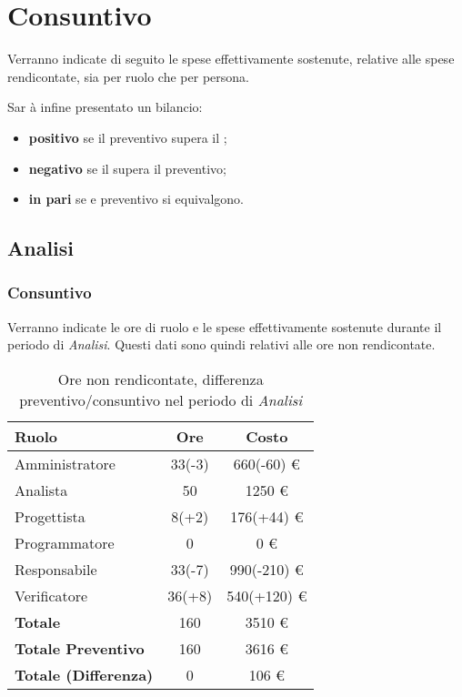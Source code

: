 \section{Consuntivo}
Verranno indicate di seguito le spese effettivamente sostenute, relative alle spese rendicontate, sia per ruolo che per persona.

Sar \`a infine presentato un bilancio:
\begin{itemize}
\item \textbf{positivo} se il preventivo supera il ;
\item \textbf{negativo} se il  supera il preventivo;
\item \textbf{in pari} se  e preventivo si equivalgono.
\end{itemize}


\subsection{Analisi}
\subsubsection{Consuntivo}
Verranno indicate le ore di ruolo e le spese effettivamente sostenute durante il periodo di \textit{Analisi}. Questi dati sono quindi relativi alle ore non rendicontate.

\begin{table}[H]
	\centering
	\begin{tabular}{ l c c }
		\textbf{Ruolo} & \textbf{Ore} & \textbf{Costo} \\
		\hline
		Amministratore & 33(-3) & 660(-60) \euro{} \\
		Analista & 50 & 1250 \euro{} \\
		Progettista & 8(+2) & 176(+44) \euro{} \\
		Programmatore & 0 & 0 \euro{} \\
		Responsabile & 33(-7) & 990(-210) \euro{} \\
		Verificatore & 36(+8) & 540(+120) \euro{} \\
		\hline
		\textbf{Totale \glossaryItem{Consuntivo}} & 160 & 3510 \euro{} \\
		\hline
		\textbf{Totale Preventivo} & 160 & 3616 \euro{} \\
		\hline
		\textbf{Totale (Differenza)} & 0 & 106 \euro{} \\
		\hline
	\end{tabular}
	\caption{Ore non rendicontate, differenza preventivo/consuntivo nel periodo di \textit{Analisi}}
\end{table}



